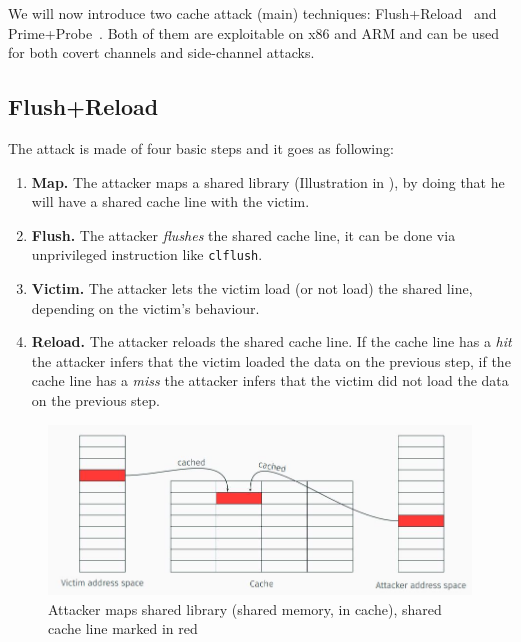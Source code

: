 We will now introduce two cache attack (main) techniques:
Flush+Reload~\cite{Gullasch:2011:CGB:2006077.2006784,
Osvik:2006:CAC:2117739.2117741, Yarom2014} and
Prime+Probe~\cite{Percival2009,Osvik:2006:CAC:2117739.2117741,Liu:2015:LCS:2867539.2867673}.
Both of them are exploitable on x86 and ARM and can be used for both covert
channels and side-channel attacks.
\subsection{Flush+Reload}
\label{subsec:flushreload}
The attack is made of four basic steps and it goes as following:
\begin{enumerate}
    \item \textbf{Map. } The attacker maps a shared library (Illustration in
    ), by doing that he will have a shared cache line
    with the victim.
    \item \textbf{Flush.} The attacker \textit{flushes} the shared cache line,
    it can be done via unprivileged instruction like \texttt{clflush}.
    \item \textbf{Victim.} The attacker lets the victim load (or not load) the
    shared line, depending on the victim's behaviour.
    \item \textbf{Reload.} The attacker reloads the shared cache line. If the
    cache line has a \textit{hit} the attacker infers that the victim loaded the
    data on the previous step, if the cache line has a \textit{miss} the
    attacker infers that the victim did not load the data on the previous step.
\end{enumerate}

\begin{figure}[!ht]
    \centering
    \includegraphics[width=\textwidth]{images/chapter_6/fr_sharedlib.JPG}
    \caption{Attacker maps shared library (shared memory, in cache), shared cache line marked in red}
    \label{fig:fr_sharedlib}
\end{figure}

